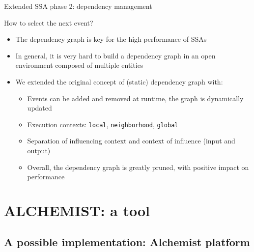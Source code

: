 \documentclass[presentation]{beamer} %
\begin{document}
\begin{frame}{Extended SSA phase 2: dependency management}
  \begin{block}{How to select the next event?}
    \begin{itemize}
      \item The dependency graph is key for the high performance of SSAs \cite{slepoy2008}
      \item In general, it is very hard to build a dependency graph in an open environment composed of multiple entities
      \item We extended the original concept of (static) dependency graph with:
      \begin{itemize}
        \item Events can be added and removed at runtime, the graph is dynamically updated
        \item Execution contexts: \texttt{local}, \texttt{neighborhood}, \texttt{global}
        \item Separation of influencing context and context of influence (input and output)
        \item Overall, the dependency graph is greatly pruned, with positive impact on performance
      \end{itemize}
    \end{itemize}
  \end{block}
\end{frame}


\section{ALCHEMIST: a tool}



\subsection{A possible implementation: Alchemist platform}
\end{document}
